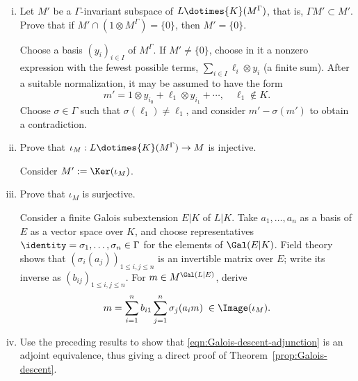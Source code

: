 	\begin{enumerate}[(i)]
		\item Let $M'$ be a $\Gamma$-invariant subspace of
		$L\dotimes{K}(M^\Gamma)$, that is, $\Gamma M'\subset M'$. Prove that
		if $M'\cap(1\otimes M^\Gamma)=\{0\}$, then $M'=\{0\}$.

		\begin{hint}
			Choose a basis $(y_i)_{i\in I}$ of $M^\Gamma$. If $M'\neq\{0\}$,
			choose in it a nonzero expression with the fewest possible terms,
			$\sum_{i\in I}\ell_i\otimes y_i$ (a finite sum). After a suitable
			normalization, it may be assumed to have the form
			\[ m' = 1 \otimes y_{i_0} + \ell_1 \otimes y_{i_1} + \cdots, \quad \ell_1 \notin K. \]
			Choose $\sigma\in\Gamma$ such that
			$\sigma(\ell_1)\neq\ell_1$, and consider $m'-\sigma(m')$ to obtain a
			contradiction.
		\end{hint}

		\item Prove that $\iota_M:L\dotimes{K}(M^\Gamma)\to M$ is injective.
		\begin{hint}
			Consider $M':=\Ker(\iota_M)$.
		\end{hint}

		\item Prove that $\iota_M$ is surjective.

		\begin{hint}
			Consider a finite Galois subextension $E|K$ of $L|K$. Take
			$a_1,\ldots,a_n$ as a basis of $E$ as a vector space over $K$, and
			choose representatives $\identity=\sigma_1,\ldots,\sigma_n\in\Gamma$
			for the elements of $\Gal(E|K)$. Field theory shows that
			$(\sigma_i(a_j))_{1\leq i,j\leq n}$ is an invertible matrix over $E$;
			write its inverse as $(b_{ij})_{1\leq i,j\leq n}$. For
			$m\in M^{\Gal(L|E)}$, derive
			\[ m = \sum_{i=1}^n b_{i1} \sum_{j=1}^n \sigma_j(a_i m) \; \in \Image(\iota_M). \]
		\end{hint}

		\item Use the preceding results to show that
		\eqref{eqn:Galois-descent-adjunction} is an adjoint equivalence, thus
		giving a direct proof of Theorem~\ref{prop:Galois-descent}.
	\end{enumerate}

